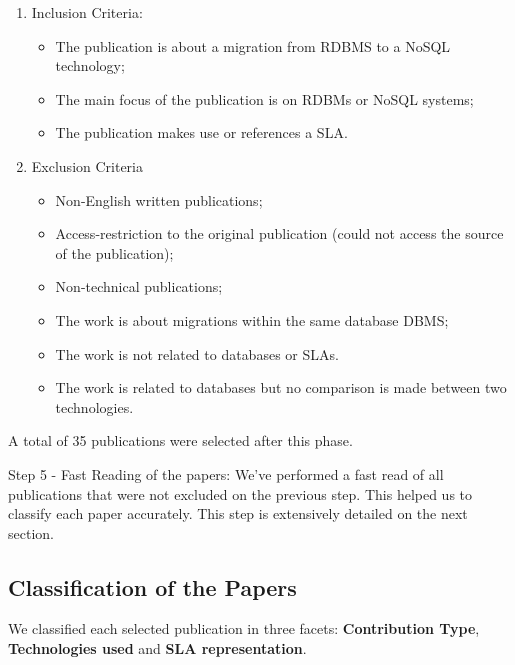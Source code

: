 \documentclass[conference, 10pt, a4paper]{IEEEtran}
\begin{document}
\begin{enumerate}
    \item Inclusion Criteria: 
    \begin{itemize}
      \item The publication is about a migration from RDBMS to a NoSQL technology;
      \item The main focus of the publication is on RDBMs or NoSQL systems;
      \item The publication makes use or references a SLA.
    \end{itemize}
    \item Exclusion Criteria
	\begin{itemize}
    \item Non-English written publications;
		\item Access-restriction to the original publication (could not access the source of the publication);
		\item Non-technical publications;
    \item The work is about migrations within the same database DBMS;
    \item The work is not related to databases or SLAs.
    \item The work is related to databases but no comparison is made between two technologies.
    \end{itemize}
    
\end{enumerate}
A total of 35 publications were selected after this phase. 

Step 5 - Fast Reading of the papers: We've performed a fast read of all publications that were not excluded on the previous step. This helped us to classify each paper accurately. This step is extensively detailed on the next section. 


\subsection{Classification of the Papers}

We classified each selected publication in three facets: \textbf{Contribution Type}, \textbf{Technologies used} and \textbf{SLA representation}. 
\end{document}
